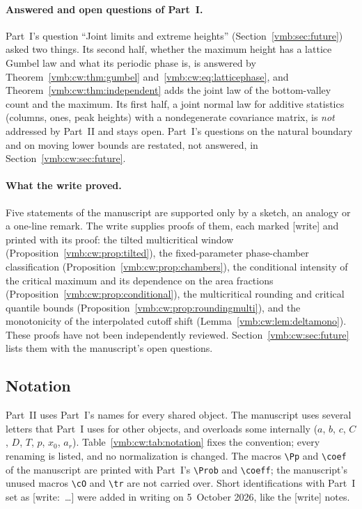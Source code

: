 \documentclass[11pt,a4paper]{article}
\numberwithin{equation}{section}
\theoremstyle{definition}\newtheorem{definition}[theorem]{Definition}
\theoremstyle{remark}\newtheorem{remark}[theorem]{Remark}
\newcommand{\Prob}{\mathbb P}
\newcommand{\coeff}[2]{[#1^{#2}]}
\newcommand{\wrt}[1]{\textup{[}\textsf{write:}~#1\textup{]}}
\begin{document}
\paragraph{Answered and open questions of Part~I.}
Part~I's question ``Joint limits and extreme heights''
(Section~\ref{vmb:sec:future}) asked two things. Its second half, whether the
maximum height has a lattice Gumbel law and what its periodic phase is, is
answered by Theorem~\ref{vmb:cw:thm:gumbel} and~\eqref{vmb:cw:eq:latticephase},
and Theorem~\ref{vmb:cw:thm:independent} adds the joint law of the bottom-valley
count and the maximum. Its first half, a joint normal law for additive
statistics (columns, ones, peak heights) with a nondegenerate covariance
matrix, is \emph{not} addressed by Part~II and stays open. Part~I's questions
on the natural boundary and on moving lower bounds are restated, not
answered, in Section~\ref{vmb:cw:sec:future}.

\paragraph{What the write proved.}
Five statements of the manuscript are supported only by a sketch, an
analogy or a one-line remark. The write supplies proofs of them, each marked
\textsf{[write]} and printed with its proof: the tilted multicritical window
(Proposition~\ref{vmb:cw:prop:tilted}), the fixed-parameter phase-chamber
classification (Proposition~\ref{vmb:cw:prop:chambers}), the conditional
intensity of the critical maximum and its dependence on the area fractions
(Proposition~\ref{vmb:cw:prop:conditional}), the multicritical rounding and
critical quantile bounds (Proposition~\ref{vmb:cw:prop:roundingmulti}), and the
monotonicity of the interpolated cutoff shift
(Lemma~\ref{vmb:cw:lem:deltamono}). These proofs have not been independently
reviewed. Section~\ref{vmb:cw:sec:future} lists them with the manuscript's
open questions.

\subsection{Notation}
\label{vmb:cw:sec:notation}
Part~II uses Part~I's names for every shared object. The manuscript uses
several letters that Part~I uses for other objects, and overloads some
internally ($a$, $b$, $c$, $C$, $D$, $T$, $p$, $x_0$, $a_r$).
Table~\ref{vmb:cw:tab:notation} fixes the convention; every renaming is
listed, and no normalization is changed. The macros \verb|\Pp| and
\verb|\coef| of the manuscript are printed with Part~I's \verb|\Prob| and
\verb|\coeff|; the manuscript's unused macros \verb|\cO| and \verb|\tr| are
not carried over. Short identifications with Part~I set as
\wrt{\ldots} were added in writing on 5~October 2026, like the
\textsf{[write]} notes.
\end{document}
